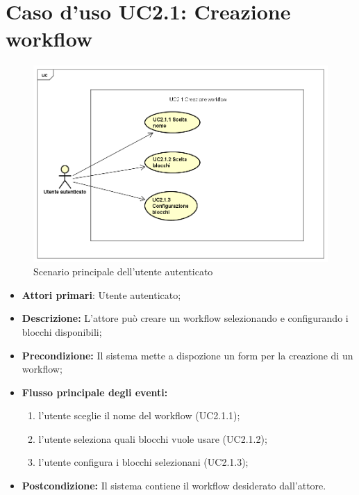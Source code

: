 		\section{Caso d'uso UC2.1: Creazione workflow}
		\begin{figure} [h]
			\centering
			\includegraphics[scale=0.4]{./Diagram/UC2-1.png}
			\caption{Scenario principale dell'utente autenticato }\label{}
		\end{figure}
		\begin{itemize}
			\item \textbf{Attori primari}: Utente autenticato;
			\item \textbf{Descrizione:} L'attore può creare un workflow selezionando e configurando i blocchi disponibili;
			\item \textbf{Precondizione:} Il sistema mette a dispozione un form per la creazione di un workflow;
			\item \textbf{Flusso principale degli eventi:}
			\begin{enumerate}
				\item l'utente sceglie il nome del workflow (UC2.1.1);
				\item l'utente seleziona quali blocchi vuole usare (UC2.1.2);
				\item l'utente configura i blocchi selezionani (UC2.1.3);
			\end{enumerate}
			\item \textbf{Postcondizione:} Il sistema contiene il workflow desiderato dall'attore.
		\end{itemize}
